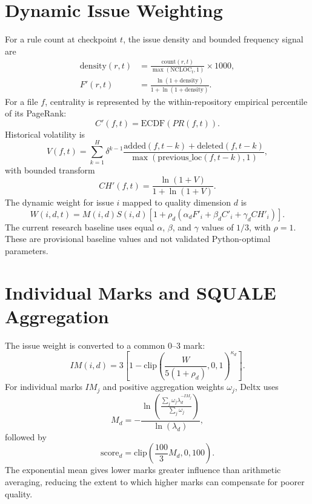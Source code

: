 \documentclass[12pt,a4paper,oneside]{report}
\begin{document}
\section{Dynamic Issue Weighting}
For a rule count at checkpoint $t$, the issue density and bounded frequency signal are
\begin{align}
\mathrm{density}(r,t) &= \frac{\mathrm{count}(r,t)}{\max(\mathrm{NCLOC}_t,1)}\times1000,\\
F'(r,t) &= \frac{\ln(1+\mathrm{density})}{1+\ln(1+\mathrm{density})}.
\end{align}
For a file $f$, centrality is represented by the within-repository empirical percentile of its PageRank:
\begin{equation}
C'(f,t)=\mathrm{ECDF}(PR(f,t)).
\end{equation}
Historical volatility is
\begin{equation}
V(f,t)=\sum_{k=1}^{H}\delta^{k-1}\frac{\mathrm{added}(f,t-k)+\mathrm{deleted}(f,t-k)}{\max(\mathrm{previous\_loc}(f,t-k),1)},
\end{equation}
with bounded transform
\begin{equation}
CH'(f,t)=\frac{\ln(1+V)}{1+\ln(1+V)}.
\end{equation}
The dynamic weight for issue $i$ mapped to quality dimension $d$ is
\begin{equation}
W(i,d,t)=M(i,d)S(i,d)\left[1+\rho_d\left(\alpha_dF'_i+\beta_dC'_i+\gamma_dCH'_i\right)\right].
\end{equation}
The current research baseline uses equal $\alpha$, $\beta$, and $\gamma$ values of $1/3$, with $\rho=1$. These are provisional baseline values and not validated Python-optimal parameters.

\section{Individual Marks and SQUALE Aggregation}
The issue weight is converted to a common 0--3 mark:
\begin{equation}
IM(i,d)=3\left[1-\mathrm{clip}\left(\frac{W}{5(1+\rho_d)},0,1\right)^{\kappa_d}\right].
\end{equation}
For individual marks $IM_j$ and positive aggregation weights $\omega_j$, Deltx uses
\begin{equation}
M_d=-\frac{\ln\left(\frac{\sum_j\omega_j\lambda_d^{-IM_j}}{\sum_j\omega_j}\right)}{\ln(\lambda_d)},
\end{equation}
followed by
\begin{equation}
\mathrm{score}_d=\mathrm{clip}\left(\frac{100}{3}M_d,0,100\right).
\end{equation}
The exponential mean gives lower marks greater influence than arithmetic averaging, reducing the extent to which higher marks can compensate for poorer quality.
\end{document}
